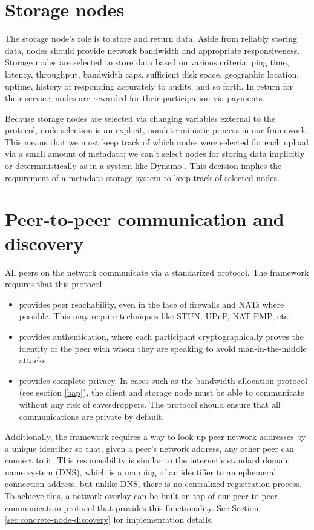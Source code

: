 \documentclass[11pt,fleqn,openany]{book}
\begin{document}
\section{Storage nodes}

The storage node's role is to store and return data.
Aside from reliably storing data, nodes should provide
network bandwidth and appropriate responsiveness.
Storage nodes are selected to store data based on various criteria: ping time,
latency, throughput, bandwidth caps, sufficient disk space,
geographic location, uptime, history of responding accurately to audits, and so forth.
In return for their service, nodes are rewarded for their participation via
payments.

Because storage
nodes are selected via changing variables external to the protocol, node
selection is an explicit, nondeterministic process in our framework. This means
that we must keep track of which nodes were selected for each upload via a
small amount of metadata; we can't select nodes for storing data implicitly or
deterministically as in a system like Dynamo \cite{dynamo}. This decision
implies the requirement of a metadata storage system to keep track
of selected nodes.

\section{Peer-to-peer communication and discovery}

All peers on the network communicate via a standarized protocol. The
framework requires that this protocol:

\begin{itemize}
\item provides peer reachability, even in the face of firewalls
and NATs where possible.
This may require techniques like STUN, UPnP, NAT-PMP, etc.
\item provides authentication, where each participant cryptographically
proves the identity of the peer with whom they are speaking to avoid
man-in-the-middle attacks.
\item provides complete privacy. In cases such as the bandwidth allocation
protocol (see section \ref{bap}), the client and storage node must be able
to communicate without any risk of eavesdroppers. The protocol should
ensure that all communications are private by default.
\end{itemize}

Additionally, the framework requires a way to look up peer network addresses
by a unique identifier so that, given a peer's network address, any other
peer can connect to it. This responsibility is similar to the internet's
standard domain name system (DNS), which is a mapping of an identifier to an
ephemeral connection address, but unlike DNS, there is no centralized
registration process.
To achieve this, a network overlay can be
built on top of our peer-to-peer communication protocol that provides this
functionality. See Section \ref{sec:concrete-node-discovery} for
implementation details.
\end{document}
